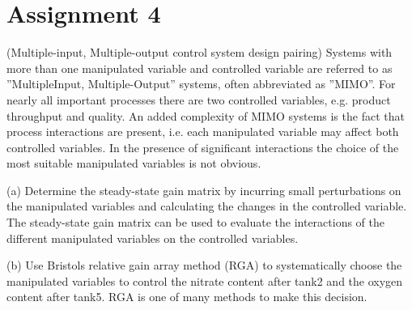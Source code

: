 \section*{Assignment 4}\label{sec:Ass4}
(Multiple-input, Multiple-output control system design pairing)
Systems with more than one manipulated variable and controlled variable are referred to as ”MultipleInput,
Multiple-Output” systems, often abbreviated as ”MIMO”. For nearly all important processes
there are two controlled variables, e.g. product throughput and quality. An added complexity of
MIMO systems is the fact that process interactions are present, i.e. each manipulated variable may
affect both controlled variables. In the presence of significant interactions the choice of the most
suitable manipulated variables is not obvious.

(a) Determine the steady-state gain matrix by incurring small perturbations on the manipulated variables
and calculating the changes in the controlled variable. The steady-state gain matrix can be
used to evaluate the interactions of the different manipulated variables on the controlled variables.

(b) Use Bristols relative gain array method (RGA) to systematically choose the manipulated variables
to control the nitrate content after tank2 and the oxygen content after tank5. RGA is one of many
methods to make this decision.
